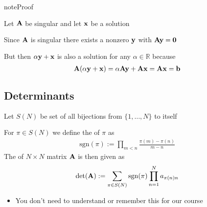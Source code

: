 \documentclass[letterpaper,10pt,english]{jupyterBook}
\begin{document}
\begin{sphinxadmonition}{note}{Proof}

\sphinxAtStartPar
Let \({\bf A}\) be singular and let \({\bf x}\) be a solution

\sphinxAtStartPar
Since \({\bf A}\) is singular there exists a nonzero \({\bf y}\) with \({\bf A}
{\bf y} = {\bf 0}\)

\sphinxAtStartPar
But then \(\alpha {\bf y} + {\bf x}\) is also a solution for any \(\alpha \in
\mathbb{R}\) because
\begin{equation*}
\begin{split} 
%
{\bf A}(\alpha {\bf y} + {\bf x}) 
= \alpha {\bf A} {\bf y} + {\bf A} {\bf x}
= {\bf A} {\bf x} = {\bf b}
%
\end{split}
\end{equation*}\end{sphinxadmonition}


\subsection{Determinants}
\label{\detokenize{05.linear_algebra:determinants}}
\sphinxAtStartPar
Let \(S(N)\) be set of all bijections from \(\{1, \ldots, N\}\) to itself

\sphinxAtStartPar
For \(\pi \in S(N)\) we define the  of \(\pi\) as
\begin{equation*}
\begin{split}
%
\mathrm{sgn}(\pi) := \prod_{m < n} \frac{\pi(m) - \pi(n)}{m - n}
%
\end{split}
\end{equation*}
\sphinxAtStartPar
The  of \(N \times N\) matrix \({\bf A}\) is then given as
\begin{equation*}
\begin{split}
%
\det({\bf A}) 
:= \sum_{\pi \in S(N)} \mathrm{sgn}(\pi) \prod_{n=1}^N a_{\pi(n) n}
%
\end{split}
\end{equation*}\begin{itemize}
\item {} 
\sphinxAtStartPar
You don’t need to understand or remember this for our course

\end{itemize}
\end{document}
